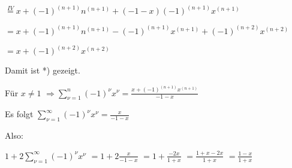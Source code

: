 $ \overset{IV}{=} x + (-1)^{(n+1)} n^{(n+1)} + (-1-x) (-1)^{(n+1)} x^{(n+1)}$

$ =  x + (-1)^{(n+1)} n^{(n+1)} - (-1)^{(n+1)} x^{(n+1)} + (-1)^{(n+2)} x^{(n+2)}$

$ = x + (-1)^{(n+2)}x^{(n+2)}$

Damit ist *) gezeigt.

Für $x \neq 1 $
$\Rightarrow \sum\limits^{n}_{\nu=1}(-1)^{\nu}x^{\nu} = \frac{x+(-1)^{(n+1)}x^{(n+1)}}{-1-x}$ 

Es folgt $\sum\limits^{\infty}_{\nu=1}(-1)^{\nu}x^{\nu} = \frac{x}{-1-x}$

Also:

$1+2\sum\limits^{\infty}_{\nu=1}(-1)^{\nu}x^{\nu} $
$ = 1+2\frac{x}{-1-x}$
$ = 1 + \frac{-2x}{1+x}$
$ = \frac{1+x-2x}{1+x}$
$ = \frac{1-x}{1+x}$


